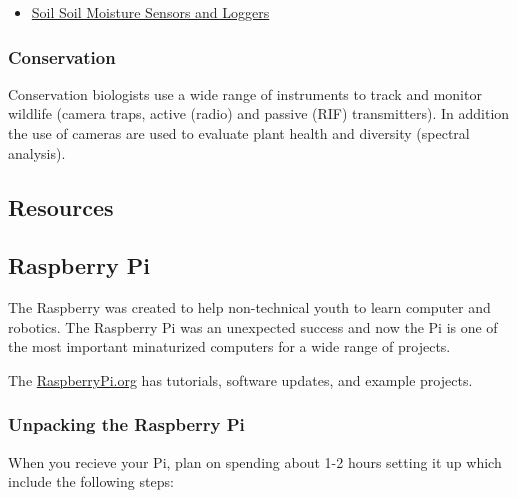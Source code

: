 \documentclass{article}\usepackage[]{graphicx}\usepackage[]{color}
\begin{document}
\begin{itemize}
\item \href{https://fyi.extension.wisc.edu/cropirrigation/files/2015/03/Methods.to_.Monitor.Soil_.Moisture.pdf}{Soil Soil Moisture Sensors and Loggers}
\end{itemize}

\subsubsection{Conservation} 

Conservation biologists use a wide range of instruments to track and monitor wildlife (camera traps, active (radio) and passive (RIF) transmitters). In addition the use of cameras are used to evaluate plant health and diversity (spectral analysis). 



\subsection{Resources}

\subsection{Raspberry Pi}

The Raspberry was created to help non-technical youth to learn computer and robotics. The Raspberry Pi was an unexpected success and now the Pi is one of the most important minaturized computers for a wide range of projects.  

The \href{https://www.raspberrypi.org/}{RaspberryPi.org} has tutorials, software updates, and example projects.

\subsubsection{Unpacking the Raspberry Pi}

When you recieve your Pi, plan on spending about 1-2 hours setting it up which include the following steps:
\end{document}
